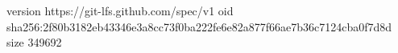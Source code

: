 version https://git-lfs.github.com/spec/v1
oid sha256:2f80b3182eb43346e3a8cc73f0ba222fe6e82a877f66ae7b36c7124cba0f7d8d
size 349692
